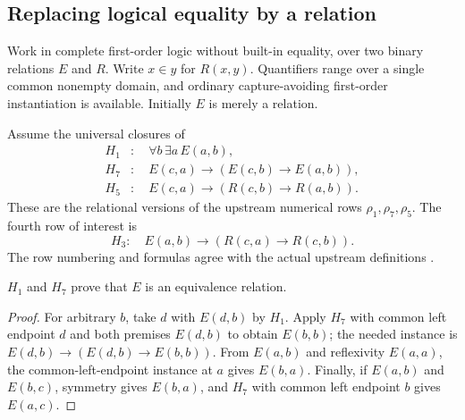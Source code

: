 \subsection{Replacing logical equality by a relation}

Work in complete first-order logic without built-in equality,
over two binary relations $E$ and $R$. Write $x\in y$ for
$R(x,y)$. Quantifiers range over a single common nonempty
domain, and ordinary capture-avoiding first-order
instantiation is available. Initially $E$ is merely a relation.

Assume the universal closures of
\begin{align*}
 H_1 &: \quad \forall b\,\exists a\,E(a,b),\\
 H_7 &: \quad E(c,a)\to(E(c,b)\to E(a,b)),\\
 H_5 &: \quad E(c,a)\to(R(c,b)\to R(a,b)).
\end{align*}
These are the relational versions of the upstream numerical
rows $\rho_1,\rho_7,\rho_5$. The fourth row of interest is
\[
 H_3:\quad E(a,b)\to(R(c,a)\to R(c,b)).
 \tag{right congruence}
\]
The row numbering and formulas agree with the actual upstream
definitions \cite{codes,tarski}.

\begin{lemma}
\label{lem:equiv}
$H_1$ and $H_7$ prove that $E$ is an equivalence relation.
\end{lemma}
\begin{proof}
For arbitrary $b$, take $d$ with $E(d,b)$ by $H_1$.
Apply $H_7$ with common left endpoint $d$ and both premises
$E(d,b)$ to obtain $E(b,b)$; the needed instance is
$E(d,b)\to(E(d,b)\to E(b,b))$.
From $E(a,b)$ and reflexivity $E(a,a)$, the common-left-endpoint
instance at $a$ gives $E(b,a)$.
Finally, if $E(a,b)$ and $E(b,c)$, symmetry gives $E(b,a)$,
and $H_7$ with common left endpoint $b$ gives $E(a,c)$.
\end{proof}

